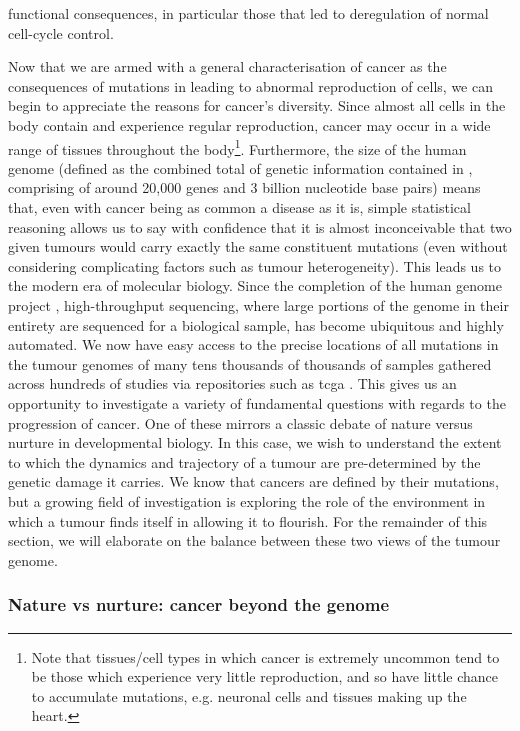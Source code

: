 \documentclass[thesis.tex]{subfiles}
\begin{document}
functional consequences, in particular those that led to deregulation of normal cell-cycle control.

Now that we are armed with a general characterisation of cancer as the consequences of mutations in  leading to abnormal reproduction of cells, we can begin to appreciate the reasons for cancer's diversity. Since almost all cells in the body contain  and experience regular reproduction, cancer may occur in a wide range of tissues throughout the body\footnote{Note that tissues/cell types in which cancer is extremely uncommon tend to be those which experience very little reproduction, and so have little chance to accumulate mutations, e.g. neuronal cells and tissues making up the heart.}. Furthermore, the size of the human genome (defined as the combined total of genetic information contained in , comprising of around 20,000 genes and 3 billion nucleotide base pairs) means that, even with cancer being as common a disease as it is, simple statistical reasoning allows us to say with confidence that it is almost inconceivable that two given tumours would carry exactly the same constituent mutations (even without considering complicating factors such as tumour heterogeneity). This leads us to the modern era of molecular biology. Since the completion of the human genome project \citep{lander_initial_2001}, high-throughput sequencing, where large portions of the genome in their entirety are sequenced for a biological sample, has become ubiquitous and highly automated. We now have easy access to the precise locations of all mutations in the tumour genomes of many tens thousands of thousands of samples gathered across hundreds of studies via repositories such as \gls{tcga} \citep{weinstein_cancer_2013}. This gives us an opportunity to investigate a variety of fundamental questions with regards to the progression of cancer. One of these mirrors a classic debate of nature versus nurture in developmental biology. In this case, we wish to understand the extent to which the dynamics and trajectory of a tumour are pre-determined by the genetic damage it carries. We know that cancers are defined by their mutations, but a growing field of investigation is exploring the role of the environment in which a tumour finds itself in allowing it to flourish. For the remainder of this section, we will elaborate on the balance between these two views of the tumour genome.

\subsubsection{Nature vs nurture: cancer beyond the genome}
\end{document}
